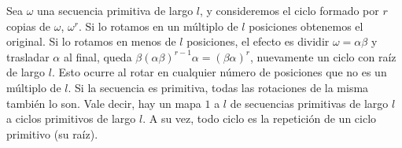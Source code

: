   Sea \(\omega \) una secuencia primitiva de largo \(l\),
  y consideremos el ciclo formado por \(r\) copias de \(\omega\),
  \(\omega^r\).
  Si lo rotamos en un múltiplo de \(l\) posiciones
  obtenemos el original.
  Si lo rotamos en menos de \(l\) posiciones,
  el efecto es dividir \(\omega = \alpha \beta\)
  y trasladar \(\alpha\) al final,
  queda \(\beta (\alpha \beta)^{r - 1} \alpha = (\beta \alpha)^r\),
  nuevamente un ciclo con raíz de largo \(l\).
  Esto ocurre al rotar en cualquier número de posiciones
  que no es un múltiplo de \(l\).
  Si la secuencia es primitiva,
  todas las rotaciones de la misma también lo son.
  Vale decir,
  hay un mapa \(1\) a \(l\) de secuencias primitivas de largo \(l\)
  a ciclos primitivos de largo \(l\).
  A su vez,
  todo ciclo es la repetición de un ciclo primitivo
  (su raíz).

